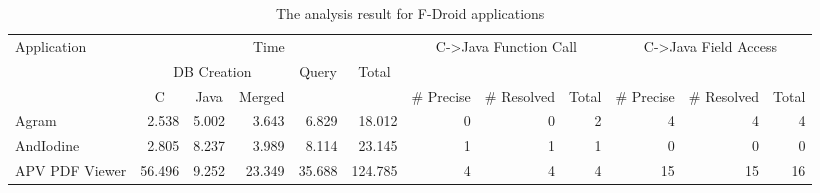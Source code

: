 \begin{table*}[t]
  \vspace{2mm}
  \caption{The analysis result for F-Droid applications}
  \label{table:RQ2}
  \vspace*{-1em}
  \centering
  \small
  \begin{tabular}{l||r|r|r|r|r||r|r|r||r|r|r}
  \multirow{3}{*}{Application} & \multicolumn{5}{c||}{Time}                                                                                                                                             & \multicolumn{3}{c||}{\multirow{2}{*}{C->Java Function Call}}                                      & \multicolumn{3}{c}{\multirow{2}{*}{C->Java Field Access}}                                          \\\hhline{~||-----||~~~||~~~}
                         & \multicolumn{3}{c|}{DB Creation}                                                  & \multicolumn{1}{c|}{\multirow{2}{*}{Query}} & \multicolumn{1}{c||}{\multirow{2}{*}{Total}} & \multicolumn{3}{c||}{}                                                                   & \multicolumn{3}{c}{}                                                                    \\\hhline{~||---~|~||------}
                         & \multicolumn{1}{c|}{C} & \multicolumn{1}{c|}{Java} & \multicolumn{1}{c|}{Merged} & \multicolumn{1}{c|}{}                       & \multicolumn{1}{c||}{}                    & \multicolumn{1}{c|}{\# Precise} & \multicolumn{1}{c|}{\# Resolved} & \multicolumn{1}{c||}{Total} & \multicolumn{1}{c|}{\# Precise} & \multicolumn{1}{c|}{\# Resolved} & \multicolumn{1}{l}{Total}  \\\hhline{=#*{4}{=|}=#=|=|=#=|=|=}
  Agram                  & 2.538                 & 5.002                    & 3.643                      & 6.829                                      & 18.012                                  & 0                           & 0                            & 2                         & 4                           & 4                            & 4                          \\
  AndIodine              & 2.805                 & 8.237                    & 3.989                      & 8.114                                      & 23.145                                  & 1                           & 1                            & 1                         & 0                           & 0                            & 0                          \\
  APV PDF Viewer         & 56.496                & 9.252                    & 23.349                     & 35.688                                     & 124.785                                 & 4                           & 4                            & 4                         & 15                          & 15                           & 16                         \\

\end{tabular}
\end{table*}
